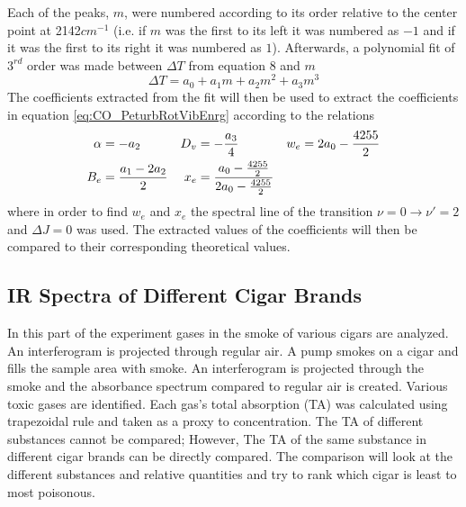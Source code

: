 \documentclass[reprint,amsmath,amssymb,aps, prl,superscriptaddress]{revtex4-2}
\begin{document}
Each of the peaks, $m$, were numbered according to its order relative to the center point at 2142$cm^{-1}$ (i.e. if $m$ was the first to its left
it was numbered as $-1$ and if it was the first to its right
it was numbered as $1$). Afterwards, a polynomial fit of $3^{rd}$ order was made between $\Delta T$ from equation 8 
and $m$
\begin{equation} \label{eq:CO_EnrgStatesFit}
    \Delta T = a_{0}+a_{1}m+a_{2}m^2+a_{3}m^3
\end{equation}
The coefficients extracted from the fit will then be used to extract the coefficients in equation \ref{eq:CO_PeturbRotVibEnrg}
according to the relations 
\begin{equation}
\begin{aligned}
\alpha &=-a_{2} & D_{v}&=-\frac{a_{3}}{4} & w_{e}&=2a_{0}-\frac{4255}{2} \\
B_{e}&=\frac{a_{1}-2a_{2}}{2} &  x_{e}&=\frac{a_{0}-\frac{4255}{2}}{2a_{0}-\frac{4255}{2}}
\end{aligned}
\label{eq:COFITcoefficients}
\centering
\end{equation}
where in order to find $w_{e}$ and $x_{e}$ the spectral line of the transition $\nu =0 \rightarrow \nu'=2$ and $\Delta J =0$ was used. The extracted values of the coefficients will then be compared to their corresponding theoretical values.

\subsection{IR Spectra of Different Cigar Brands}
In this part of the experiment gases in the smoke of various cigars are analyzed. An interferogram is projected through regular air. A pump smokes on a cigar and fills the sample area with smoke. An interferogram is projected through the smoke and the absorbance spectrum compared to regular air is created. Various toxic gases are identified. Each gas's total absorption (TA) was calculated using trapezoidal rule \cite{numerical} and taken as a proxy to concentration. The TA of different substances cannot be compared; However, The TA of the same substance in different cigar brands can be directly compared. The comparison will look at the different substances and relative quantities and try to rank which cigar is least to most poisonous.
\end{document}

